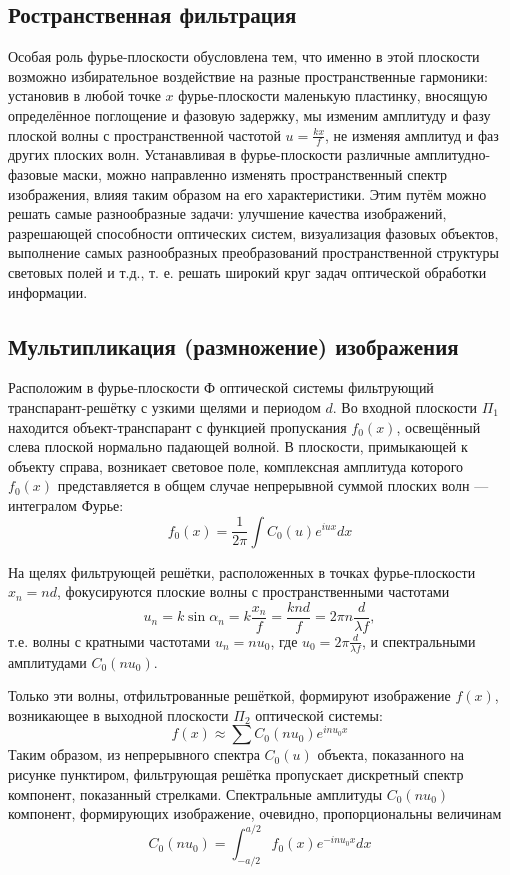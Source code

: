 \subsection{Ространственная фильтрация}
Особая роль фурье-плоскости обусловлена тем, что именно в этой плоскости возможно избирательное воздействие на разные пространственные гармоники: установив в любой точке $x$ фурье-плоскости маленькую пластинку, вносящую определённое поглощение и фазовую задержку, мы изменим амплитуду и фазу плоской волны с пространственной частотой $u = \frac{kx}{f}$, не изменяя амплитуд и фаз других плоских волн. Устанавливая в фурье-плоскости различные амплитудно-фазовые маски, можно направленно изменять пространственный спектр изображения, влияя таким образом на его характеристики. Этим путём можно решать самые разнообразные задачи: улучшение качества изображений, разрешающей способности оптических систем, визуализация фазовых объектов, выполнение самых разнообразных преобразований пространственной структуры световых полей и т.д., т. е. решать широкий круг задач оптической обработки информации.

\subsection{Мультипликация (размножение) изображения}
Расположим в фурье-плоскости Ф оптической системы фильтрующий транспарант-решётку с узкими щелями и периодом $d$. Во входной плоскости $\Pi_1$ находится объект-транспарант с функцией пропускания $f_0(x)$, освещённый слева плоской нормально падающей волной. В плоскости, примыкающей к объекту справа, возникает световое поле, комплексная амплитуда которого $f_0(x)$ представляется в общем случае непрерывной суммой плоских волн --- интегралом Фурье:
\[
f_0(x) = \frac{1}{2\pi} \int C_0(u)e^{iux}dx
\]

На щелях фильтрующей решётки, расположенных в точках фурье-плоскости $x_n = nd$, фокусируются плоские волны с пространственными частотами
\[
u_n = k \sin\alpha_n = k\frac{x_n}{f} = \frac{knd}{f} = 2\pi n \frac{d}{\lambda f},
\]
т.е. волны с кратными частотами $u_n = nu_0$, где $u_0 = 2\pi\frac{d}{\lambda f}$, и спектральными амплитудами $C_0(nu_0)$.

Только эти волны, отфильтрованные решёткой, формируют изображение $f(x)$,  возникающее в выходной плоскости $\Pi_2$ оптической системы:
\[
f(x) \approx \sum C_0(nu_0) e^{inu_0x}
\]
Таким образом, из непрерывного спектра $C_0(u)$ объекта, показанного на рисунке пунктиром, фильтрующая решётка пропускает дискретный спектр компонент, показанный стрелками. Спектральные амплитуды $C_0(nu_0)$ компонент, формирующих изображение, очевидно, пропорциональны величинам
\[
C_0(nu_0) = \int_{-a/2}^{a/2} f_0(x) e^{-inu_0x}dx
\]

